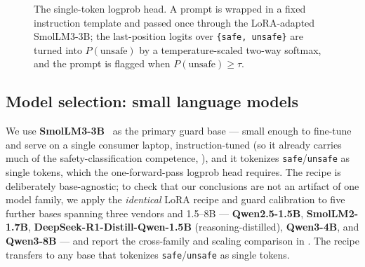 \documentclass[sigconf,nonacm]{acmart}
\begin{document}
\begin{figure}[t]
\centering
{}
\caption{The single-token logprob head. A prompt is wrapped in a fixed instruction template and passed once through the LoRA-adapted SmolLM3-3B; the last-position logits over \texttt{\{safe, unsafe\}} are turned into $P(\text{unsafe})$ by a temperature-scaled two-way softmax, and the prompt is flagged when $P(\text{unsafe}) \ge \tau$.}
\label{fig:logprob-head}
\end{figure}

\subsection{Model selection: small language models}

We use \textbf{SmolLM3-3B}~\cite{bakouch2025smollm3} as the primary guard base --- small enough to fine-tune and serve on a single consumer laptop, instruction-tuned (so it already carries much of the safety-classification competence, ), and it tokenizes \texttt{safe}/\texttt{unsafe} as single tokens, which the one-forward-pass logprob head requires. The recipe is deliberately base-agnostic; to check that our conclusions are not an artifact of one model family, we apply the \emph{identical} LoRA recipe and guard calibration to five further bases spanning three vendors and 1.5--8B --- \textbf{Qwen2.5-1.5B}, \textbf{SmolLM2-1.7B}, \textbf{DeepSeek-R1-Distill-Qwen-1.5B} (reasoning-distilled), \textbf{Qwen3-4B}, and \textbf{Qwen3-8B} --- and report the cross-family and scaling comparison in . The recipe transfers to any base that tokenizes \texttt{safe}/\texttt{unsafe} as single tokens.
\end{document}
